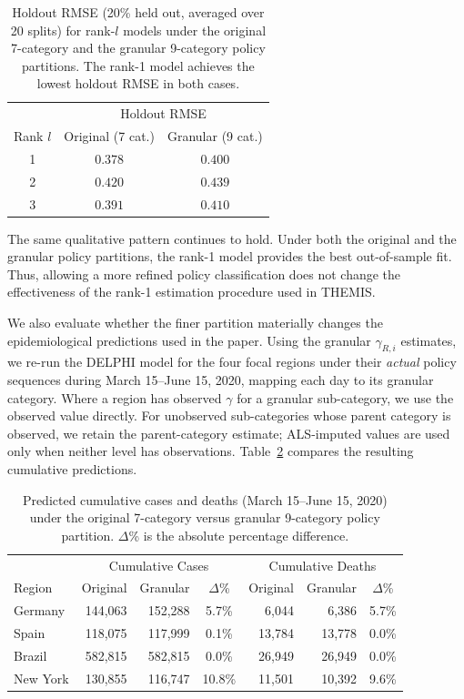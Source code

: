 \documentclass[letterpaper,twoside,11pt]{reviewresponse}
\begin{document}
\begin{enumerate}
\begin{table}[htbp!]
	\centering
	\begin{tabular}{|c|cc|}
		\hline
		& \multicolumn{2}{c|}{Holdout RMSE} \\
		Rank $l$ & Original (7 cat.) & Granular (9 cat.) \\\hline
		1 & $0.378$ & $0.400$ \\
		2 & $0.420$ & $0.439$ \\
		3 & $0.391$ & $0.410$ \\\hline
	\end{tabular}
	\caption{Holdout RMSE (20\% held out, averaged over 20 splits) for rank-$l$ models under the original 7-category and the granular 9-category policy partitions. The rank-1 model achieves the lowest holdout RMSE in both cases.}
	\label{tab:granular_rmse_r1}
\end{table}

The same qualitative pattern continues to hold. Under both the original and the granular policy partitions, the rank-1 model provides the best out-of-sample fit. Thus, allowing a more refined policy classification does not change the effectiveness of the rank-1 estimation procedure used in THEMIS.

We also evaluate whether the finer partition materially changes the epidemiological predictions used in the paper. Using the granular $\gamma_{R,i}$ estimates, we re-run the DELPHI model for the four focal regions under their \emph{actual} policy sequences during March 15--June 15, 2020, mapping each day to its granular category. Where a region has observed $\gamma$ for a granular sub-category, we use the observed value directly. For unobserved sub-categories whose parent category is observed, we retain the parent-category estimate; ALS-imputed values are used only when neither level has observations. Table~\ref{tab:granular_predictions_r1} compares the resulting cumulative predictions.

\begin{table}[h!]
	\centering
	\begin{tabular}{|l|rr|c|rr|c|}
		\hline
		& \multicolumn{3}{c|}{Cumulative Cases} & \multicolumn{3}{c|}{Cumulative Deaths} \\
		Region & Original & Granular & $\Delta$\% & Original & Granular & $\Delta$\% \\\hline
		Germany & 144{,}063 & 152{,}288 & 5.7\% & 6{,}044 & 6{,}386 & 5.7\% \\
		Spain & 118{,}075 & 117{,}999 & 0.1\% & 13{,}784 & 13{,}778 & 0.0\% \\
		Brazil & 582{,}815 & 582{,}815 & 0.0\% & 26{,}949 & 26{,}949 & 0.0\% \\
		New York & 130{,}855 & 116{,}747 & 10.8\% & 11{,}501 & 10{,}392 & 9.6\% \\\hline
	\end{tabular}
	\caption{Predicted cumulative cases and deaths (March 15--June 15, 2020) under the original 7-category versus granular 9-category policy partition. $\Delta$\% is the absolute percentage difference.}
	\label{tab:granular_predictions_r1}
\end{table}


\end{enumerate}
\end{document}
